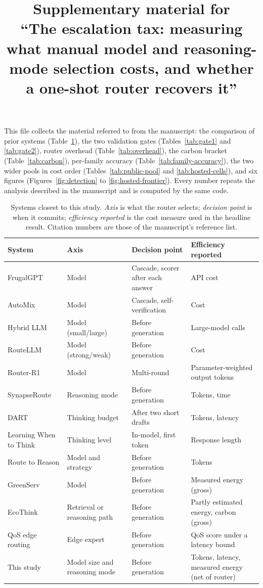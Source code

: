 \documentclass[11pt]{article}
\title{Supplementary material for\\
``The escalation tax: measuring what manual model and reasoning-mode
selection costs, and whether a one-shot router recovers it''}
\author{}
\date{}
\begin{document}
\maketitle

This file collects the material referred to from the manuscript: the
comparison of prior systems (Table~\ref{tab:prior-work}), the two validation
gates (Tables~\ref{tab:gate1} and \ref{tab:gate2}), router overhead
(Table~\ref{tab:overhead}), the carbon bracket (Table~\ref{tab:carbon}),
per-family accuracy (Table~\ref{tab:family-accuracy}), the two wider pools in
cost order (Tables~\ref{tab:public-pool} and \ref{tab:hosted-cells}), and six
figures (Figures~\ref{fig:detection} to \ref{fig:hosted-frontier}). Every
number repeats the analysis described in the manuscript and is computed by
the same code.

\begin{table}[ht]
\centering
\small
\caption{Systems closest to this study. \emph{Axis} is what the router
selects; \emph{decision point} is when it commits; \emph{efficiency
reported} is the cost measure used in the headline result. Citation numbers
are those of the manuscript's reference list.}
\label{tab:prior-work}
\renewcommand{\arraystretch}{1.15}
\begin{tabularx}{\textwidth}{@{}l l >{\raggedright\arraybackslash}X >{\raggedright\arraybackslash}X@{}}
\toprule
System & Axis & Decision point & Efficiency reported \\
\midrule
FrugalGPT & Model & Cascade, scorer after each answer & API cost \\
AutoMix & Model & Cascade, self-verification & Cost \\
Hybrid LLM & Model (small/large) & Before generation & Large-model calls \\
RouteLLM & Model (strong/weak) & Before generation & Cost \\
Router-R1 & Model & Multi-round & Parameter-weighted output tokens \\
SynapseRoute & Reasoning mode & Before generation & Tokens, time \\
DART & Thinking budget & After two short drafts & Tokens, latency \\
Learning When to Think & Thinking level & In-model, first token & Response length \\
Route to Reason & Model and strategy & Before generation & Tokens \\
GreenServ & Model & Before generation & Measured energy (gross) \\
EcoThink & Retrieval or reasoning path & Before generation & Partly estimated energy, carbon (gross) \\
QoS edge routing & Edge expert & Before generation & QoS score under a latency bound \\
\midrule
This study & Model size and reasoning mode & Before generation & Tokens, latency, measured energy (net of router) \\
\bottomrule
\end{tabularx}
\end{table}
\end{document}
